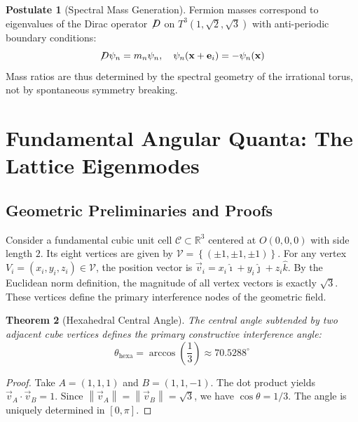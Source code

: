 \documentclass[12pt,a4paper,oneside]{article}
\theoremstyle{plain}
\newtheorem{theorem}{Theorem}[section]
\theoremstyle{definition}
\newtheorem{postulate}[theorem]{Postulate}
\theoremstyle{remark}
\newcommand{\R}{\mathbb{R}}
\newcommand{\vecnorm}[1]{\left\|#1\right\|}
\newcommand{\Tthree}{T^3(1,\sqrt{2},\sqrt{3})}
\newcommand{\slashed}[1]{\not\!#1}
\begin{document}
\begin{postulate}[Spectral Mass Generation]
\label{post:spectral}
Fermion masses correspond to eigenvalues of the Dirac operator $\slashed{D}$ on $\Tthree$ with anti-periodic boundary conditions:
\begin{equation}
\slashed{D} \psi_n = m_n \psi_n, \quad \psi_n(\mathbf{x} + \mathbf{e}_i) = -\psi_n(\mathbf{x})
\end{equation}
Mass ratios are thus determined by the spectral geometry of the irrational torus, not by spontaneous symmetry breaking.
\end{postulate}

\section{Fundamental Angular Quanta: The Lattice Eigenmodes}
\label{sec:angular_quanta}

\subsection{Geometric Preliminaries and Proofs}
Consider a fundamental cubic unit cell $\mathcal{C} \subset \R^3$ centered at $O(0,0,0)$ with side length $2$. Its eight vertices are given by $\mathcal{V} = \left\{ (\pm 1, \pm 1, \pm 1) \right\}$. For any vertex $V_i = (x_i, y_i, z_i) \in \mathcal{V}$, the position vector is $\vec{v}_i = x_i \hat{\imath} + y_i \hat{\jmath} + z_i \hat{k}$. By the Euclidean norm definition, the magnitude of all vertex vectors is exactly $\sqrt{3}$. These vertices define the primary interference nodes of the geometric field.

\begin{theorem}[Hexahedral Central Angle]
\label{thm:hexa}
The central angle subtended by two adjacent cube vertices defines the primary constructive interference angle:
\begin{equation}
\boxed{\theta_{\mathrm{hexa}} = \arccos\left(\frac{1}{3}\right) \approx 70.5288^\circ}
\end{equation}
\end{theorem}
\begin{proof}
Take $A=(1,1,1)$ and $B=(1,1,-1)$. The dot product yields $\vec{v}_A \cdot \vec{v}_B = 1$. Since $\vecnorm{\vec{v}_A}=\vecnorm{\vec{v}_B}=\sqrt{3}$, we have $\cos\theta = 1/3$. The angle is uniquely determined in $[0,\pi]$.
\end{proof}
\end{document}
